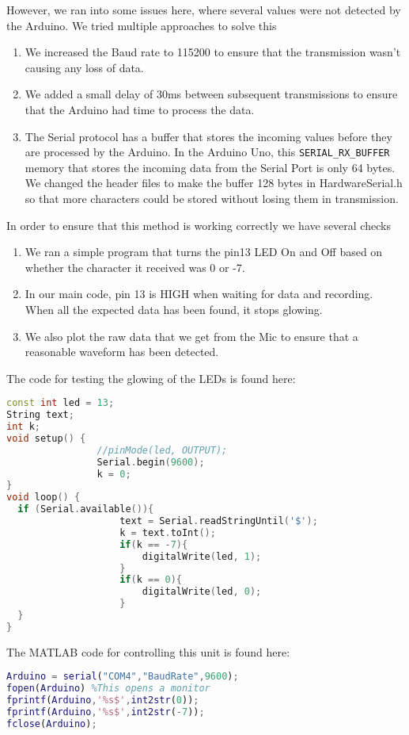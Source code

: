 However, we ran into some issues here, where several values were not detected by
the Arduino. We tried multiple approaches to solve this 

\begin{enumerate}
    \item We increased the Baud rate to 115200 to ensure that the transmission
    wasn't causing any loss of data. 

    \item We added a small delay of 30ms between subsequent transmissions to
    ensure that the Arduino had time to process the data.

    \item The Serial protocol has a buffer that stores the incoming values
    before they are processed by the Arduino. In the Arduino Uno, this
    \texttt{SERIAL\_RX\_BUFFER} memory that stores the incoming data from the
    Serial Port is only 64 bytes. We changed the header files to make the buffer
    128 bytes in HardwareSerial.h so that more characters could be stored
    without losing them in transmission.
\end{enumerate}

In order to ensure that this method is working correctly we have several checks 

\begin{enumerate}
    \item We ran a simple program that turns the pin13 LED On and Off based on
    whether the character it received was 0 or -7.

    \item In our main code, pin 13 is HIGH when waiting for data and recording.
    When all the expected data has been found, it stops glowing.
    
    \item We also plot the raw data that we get from the Mic to ensure that a
    reasonable waveform has been detected.
\end{enumerate}

The code for testing the glowing of the LEDs is found here: 

\begin{lstlisting}[language=C++]
const int led = 13;
String text;
int k;
void setup() {
                //pinMode(led, OUTPUT);
                Serial.begin(9600);
                k = 0;
}
void loop() { 
  if (Serial.available()){
                    text = Serial.readStringUntil('$');
                    k = text.toInt(); 
                    if(k == -7){
                        digitalWrite(led, 1);
                    }
                    if(k == 0){
                        digitalWrite(led, 0);
                    }
  }
}
\end{lstlisting}

The MATLAB code for controlling this unit is found here: 

\begin{lstlisting}[language=Matlab]
Arduino = serial("COM4","BaudRate",9600);
fopen(Arduino) %This opens a monitor
fprintf(Arduino,'%s$',int2str(0));
fprintf(Arduino,'%s$',int2str(-7));
fclose(Arduino);
\end{lstlisting}

